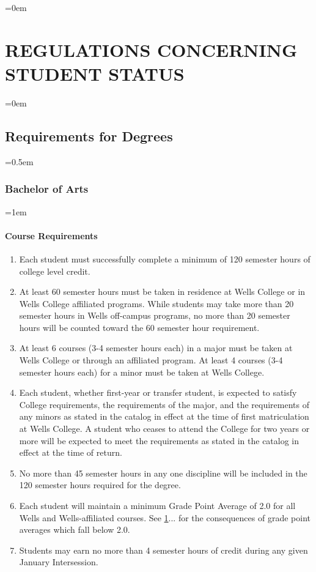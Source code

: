\documentclass{manual}
\newcommand{\modified}[1]{}
\let\stdsection\section %
\renewcommand\section{\newpage\stdsection}
\let\oldsection\section
\renewcommand\section{\leftskip=0em\oldsection}
\let\oldsubsection\subsection
\renewcommand\subsection{\leftskip=0em\oldsubsection}
\let\oldsubsubsection\subsubsection
\renewcommand\subsubsection{\leftskip=0.5em\oldsubsubsection}
\let\oldparagraph\paragraph
\renewcommand\paragraph{\leftskip=1em\oldparagraph}
\newcommand{\itemLevelA}{\alph*.}
\newcommand{\itemRefA}{\alph*}
\begin{document}
\section{REGULATIONS CONCERNING STUDENT STATUS}\label{art:RegulationsConcerningStudentStatus}

\subsection{Requirements for Degrees}

\subsubsection{Bachelor of Arts}

\paragraph{Course Requirements}

\begin{enumerate}[label=\itemLevelA,ref=\itemRefA]
\item Each student must successfully complete a minimum of 120 semester\modified{5/13/93} hours of college level credit.
\item At least 60 semester hours must be taken in residence at Wells College\modified{5/13/93} or in Wells College affiliated programs. While students may take more than 20 semester hours in Wells off-campus programs, no more than 20 semester hours will be counted toward the 60 semester hour requirement.
\item At least 6 courses (3-4 semester hours each) in a major must be taken at Wells College or through an affiliated program. At least 4 courses (3-4 semester hours each) for a minor must be taken at Wells College.
\item Each student, whether first-year or transfer student, is expected to satisfy College requirements, the requirements of the major, and the requirements \modified{4/8/97} of any minors as stated in the catalog in effect at the time of first matriculation at Wells College. A student who ceases to attend the College for two years or more will be expected to meet the requirements as stated in the catalog in effect at the time of return.
\item No more than 45 semester hours in any one discipline will be included \modified{5/13/93}  in the 120 semester hours required for the degree.
\item Each student will maintain a minimum Grade Point Average of 2.0 for all Wells and Wells-affiliated courses. See \cref{art:RegulationsConcerningStudentStatus}... for the consequences of grade point averages which fall below 2.0.
\item Students may earn no more than 4 semester hours of credit during any given January  Intersession.\modified{2/8/05}
\end{enumerate}
\end{document}
